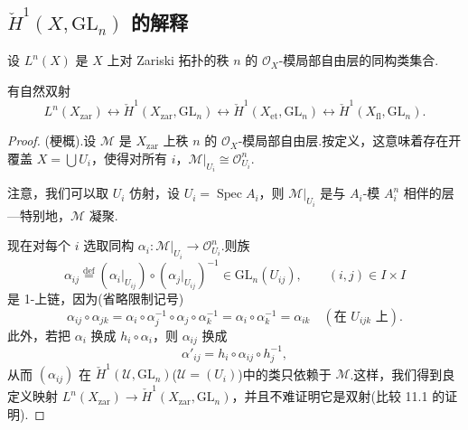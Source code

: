 \subsection*{\texorpdfstring{$\check{H}^{1}(X, \mathrm{GL}_n)$ 的解释}{H^1(X, GL_n) 的解释}}

设 $L^{n}(X)$ 是 $X$ 上对 Zariski 拓扑的秩 $n$ 的 $\mathcal{O}_X$-模局部自由层的同构类集合.

\begin{theorem}\label{thm:11.4}
有自然双射
\[
L^{n}(X_{\mathrm{zar}}) \leftrightarrow \check{H}^{1}(X_{\mathrm{zar}}, \mathrm{GL}_n) \leftrightarrow \check{H}^{1}(X_{\mathrm{et}}, \mathrm{GL}_n) \leftrightarrow \check{H}^{1}(X_{\mathrm{fl}}, \mathrm{GL}_n).
\]
\end{theorem}

\begin{proof}
(梗概).设 $\mathcal{M}$ 是 $X_{\mathrm{zar}}$ 上秩 $n$ 的 $\mathcal{O}_X$-模局部自由层.按定义，这意味着存在开覆盖 $X = \bigcup U_i$，使得对所有 $i$，$\mathcal{M}|_{U_i} \cong \mathcal{O}^{n}_{U_i}$.

注意，我们可以取 $U_i$ 仿射，设 $U_i = \operatorname{Spec} A_i$，则 $\mathcal{M}|_{U_i}$ 是与 $A_i$-模 $A^{n}_i$ 相伴的层---特别地，$\mathcal{M}$ 凝聚.

现在对每个 $i$ 选取同构 $\alpha_i \colon \mathcal{M}|_{U_i} \to \mathcal{O}^{n}_{U_i}$.则族
\[
\alpha_{ij} \overset{\mathrm{def}}{=} (\alpha_i|_{U_{ij}}) \circ (\alpha_j|_{U_{ij}})^{-1} \in \mathrm{GL}_n(U_{ij}), \qquad (i, j) \in I \times I
\]
是 1-上链，因为(省略限制记号)
\[
\alpha_{ij} \circ \alpha_{jk} = \alpha_i \circ \alpha^{-1}_{j} \circ \alpha_j \circ \alpha^{-1}_{k} = \alpha_i \circ \alpha^{-1}_{k} = \alpha_{ik} \quad (\text{在 } U_{ijk} \text{ 上}).
\]
此外，若把 $\alpha_i$ 换成 $h_i \circ \alpha_i$，则 $\alpha_{ij}$ 换成
\[
\alpha'_{ij} = h_i \circ \alpha_{ij} \circ h^{-1}_{j},
\]
从而 $(\alpha_{ij})$ 在 $\check{H}^{1}(\mathcal{U}, \mathrm{GL}_n)$($\mathcal{U} = (U_i)$)中的类只依赖于 $\mathcal{M}$.这样，我们得到良定义映射 $L^{n}(X_{\mathrm{zar}}) \to \check{H}^{1}(X_{\mathrm{zar}}, \mathrm{GL}_n)$，并且不难证明它是双射(比较 11.1 的证明).


\end{proof}
